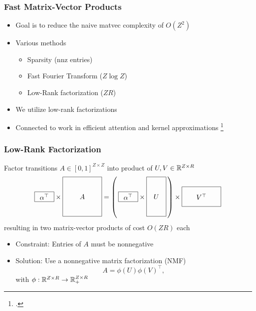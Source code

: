 \documentclass{beamer}
\begin{document}
\begin{frame}
\frametitle{Fast Matrix-Vector Products}
\begin{itemize}
\item Goal is to reduce the naive matvec complexity of $O(Z^2)$
\vspace{1em}
\item Various methods
    \begin{itemize}
    \item Sparsity (nnz entries)
    \item Fast Fourier Transform ($Z \log Z$)
    \item Low-Rank factorization ($ZR$)
    \end{itemize}
\vspace{1em}
\item We utilize low-rank factorizations
\vspace{1em}
\item Connected to work in efficient attention and kernel approximations
\footcite{performer,rfa,blanc2018adaptive}
\end{itemize}
\end{frame}

\begin{frame}
\frametitle{Low-Rank Factorization}
Factor transitions $A\in[0,1]^{Z\times Z}$ into product of $U,V\in\mathbb{R}^{Z \times R}$
\[
\vcenter{\hbox{\begin{tikzpicture}[baseline=-0.5ex]
    \draw (0,0) rectangle (1,.5) node[pos=.5] {$\alpha^\top$};
\end{tikzpicture}}}
\times
\vcenter{\hbox{\begin{tikzpicture}[baseline=-0.5ex]
    \draw (0,0) rectangle (2,2) node[pos=.5] {$A$};
\end{tikzpicture}}}
=
\left(\,
\vcenter{\hbox{\begin{tikzpicture}[baseline=-0.5ex]
    \draw (0,0) rectangle (1,.5) node[pos=.5] {$\alpha^\top$};
\end{tikzpicture}}}
\times
\vcenter{\hbox{\begin{tikzpicture}[baseline=-0.5ex]
    \draw (0,0) rectangle (1,2) node[pos=.5] {$U$};
\end{tikzpicture}}}
\,\right)
\times 
\vcenter{\hbox{\begin{tikzpicture}[baseline=-0.5ex]
    \draw (0,0) rectangle (2,1) node[pos=.5] {$V^\top$};
\end{tikzpicture}}}
\]
resulting in two matrix-vector products of cost $O(ZR)$ each
\vspace{1em}
\begin{itemize}
\item Constraint: Entries of $A$ must be nonnegative
\vspace{1em}
\item Solution: Use a nonnegative matrix factorization (NMF)
$$A = \phi(U)\phi(V)^\top,$$
with $\phi:\mathbb{R}^{Z \times R}\to\mathbb{R}_+^{Z \times R}$
\end{itemize}
\end{frame}
\end{document}
